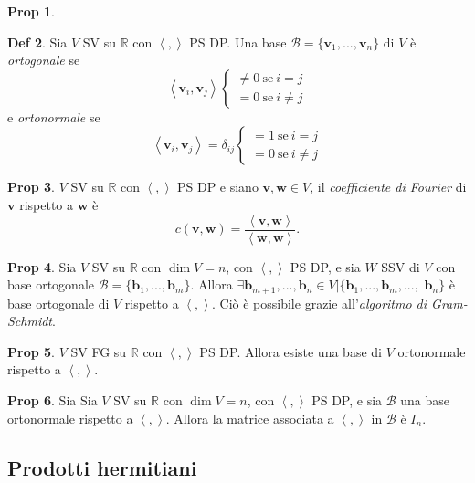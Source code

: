 \documentclass[]{article}
\newcommand{\vv}{\mathbf{v}}
\newcommand{\vw}{\mathbf{w}}
\newcommand{\vb}{\mathbf{b}}
\newcommand{\scalprod}[2]{\left\langle #1 , #2 \right\rangle}
\theoremstyle{definition}
\theoremstyle{definition}
\newtheorem{prop}{Prop}[subsection]
\theoremstyle{definition}
\newtheorem{dfn}[prop]{Def}
\begin{document}
\begin{prop}
\end{prop} \begin{dfn} Sia $V$ SV su $\mathbb{R}$ con $\scalprod{}{}$ PS DP. Una base $\mathcal{B}=\{ \vv _1 ,..., \vv _n \}$ di $V$ è \emph{ortogonale} se 
$$ \scalprod{\vv _i}{\vv _j} \left\lbrace \begin{aligned}
	\neq 0\ \mathrm{se}\ i=j \\
	=0\ \mathrm{se}\ i \neq j
\end{aligned} \right.$$
e \emph{ortonormale} se 
$$ \scalprod{\vv _i}{\vv _j} = \delta _{ij} \left\lbrace \begin{aligned}
	=1\ \mathrm{se}\ i=j \\
	=0\ \mathrm{se}\ i \neq j
\end{aligned} \right.$$

\end{dfn} \begin{prop} $V$ SV su $\mathbb{R}$ con $\scalprod{}{}$ PS DP e siano $\vv ,\vw \in V$, il \emph{coefficiente di Fourier} di $\vv$ rispetto a $\vw$ è $$c(\vv, \vw) = \frac{\scalprod{\vv}{\vw}}{\scalprod{\vw}{\vw}}.$$

\end{prop} \begin{prop} Sia $V$ SV su $\mathbb{R}$ con $\dim V =n$, con $\scalprod{}{}$ PS DP, e sia $W$ SSV di $V$ con base ortogonale $\mathcal{B}=\{ \vb _1 ,..., \vb _m \}$. Allora $\exists \vb _{m+1},..., \vb_n \in V | \{ \vb _1 ,..., \vb _m ,...,$ $\vb _n \}$ è base ortogonale di $V$ rispetto a $\scalprod{}{}$. Ciò è possibile grazie all'\emph{algoritmo di Gram-Schmidt}.

\end{prop} \begin{prop} $V$ SV FG su $\mathbb{R}$ con $\scalprod{}{}$ PS DP. Allora esiste una base di $V$ ortonormale rispetto a $\scalprod{}{}$.

\end{prop} \begin{prop} Sia Sia $V$ SV su $\mathbb{R}$ con $\dim V =n$, con $\scalprod{}{}$ PS DP, e sia $\mathcal{B}$ una base ortonormale rispetto a $\scalprod{}{}$. Allora la matrice associata a $\scalprod{}{}$ in $\mathcal{B}$ è $I_n$.
\end{prop}

\subsection{Prodotti hermitiani} 
\end{document}
